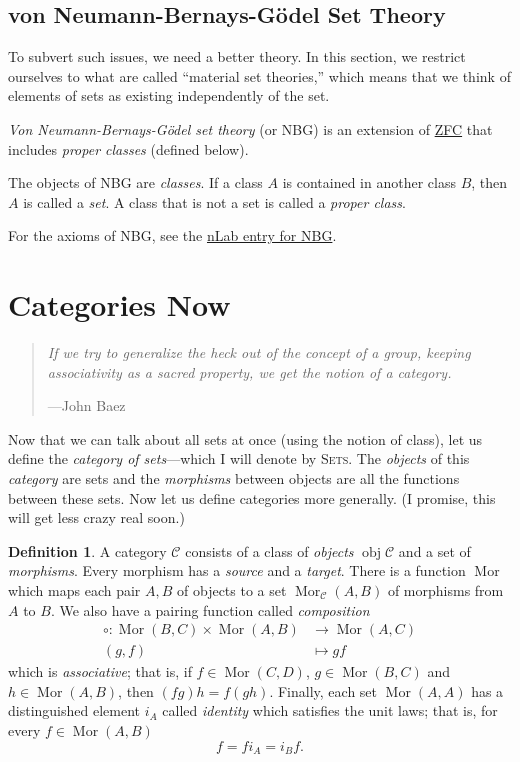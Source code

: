 \documentclass[english,12pt]{article}
\theoremstyle{definition}
\newtheorem{definition}[theorem]{Definition}
\DeclareMathOperator{\obj}{obj}
\DeclareMathOperator{\Mor}{Mor}
\newcommand{\C}{\mathcal{C}}
\begin{document}
\subsection{von Neumann-Bernays-Gödel Set Theory}

To subvert such issues, we need a better theory. In this section, we
restrict ourselves to what are called ``material set theories,'' which
means that we think of elements of sets as existing independently of the
set.

\emph{Von Neumann-Bernays-Gödel set theory} (or NBG) is an extension of
\href{https://ncatlab.org/nlab/show/ZFC}{ZFC} that includes \emph{proper
  classes} (defined below).

The objects of NBG are \emph{classes}. If a class $A$ is contained in
another class $B$, then $A$ is called a \emph{set}. A class that is not a
set is called a \emph{proper class}.

For the axioms of NBG, see the
\href{https://ncatlab.org/nlab/show/NBG}{nLab entry for NBG}.

\section{Categories Now}

\begin{quote}
  \textit{If we try to generalize the heck out of the concept of a group,
    keeping associativity as a sacred property, we get the notion of a
    category.}

  \hfill ---John Baez
\end{quote}

Now that we can talk about all sets at once (using the notion of class),
let us define the \emph{category of sets}---which I will denote by
\textsc{Sets}. The \emph{objects} of this \emph{category} are sets and the
\emph{morphisms} between objects are all the functions between these
sets. Now let us define categories more generally. (I promise, this will
get less crazy real soon.)

\begin{definition}
  A category $\C$ consists of a class of \emph{objects} $\obj \C$ and a set
  of \emph{morphisms}. Every morphism has a \emph{source} and a
  \emph{target}. There is a function $\Mor$ which maps each pair $A,B$ of
  objects to a set $\Mor_\C(A,B)$ of morphisms from $A$ to $B$. We also
  have a pairing function called \emph{composition}
  \begin{align}
    \circ: \Mor(B,C) \times \Mor(A,B) &\to \Mor(A,C) \\
    (g,f) &\mapsto gf
  \end{align}
  which is \emph{associative}; that is, if $f \in \Mor(C,D)$, $g \in
  \Mor(B,C)$ and $h \in \Mor(A,B)$, then $(fg)h = f(gh)$. Finally, each set
  $\Mor(A,A)$ has a distinguished element $i_A$ called \emph{identity}
  which satisfies the unit laws; that is, for every $f \in \Mor(A,B)$
  \begin{equation}
    f = fi_A = i_Bf.
  \end{equation}
\end{definition}
\end{document}

